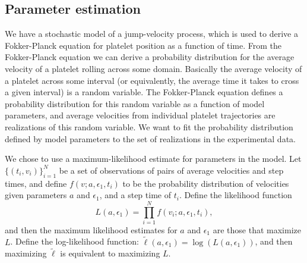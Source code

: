 
\subsection{Parameter estimation}
\label{sec:parameter-estimation}


We have a stochastic model of a jump-velocity process, which is used
to derive a Fokker-Planck equation for platelet position as a function
of time. From the Fokker-Planck equation we can derive a probability
distribution for the average velocity of a platelet rolling across
some domain. Basically the average velocity of a platelet across some
interval (or equivalently, the average time it takes to cross a given
interval) is a random variable. The Fokker-Planck equation defines a
probability distribution for this random variable as a function of
model parameters, and average velocities from individual platelet
trajectories are realizations of this random variable. We want to fit
the probability distribution defined by model parameters to the set of
realizations in the experimental data.

We chose to use a maximum-likelihood estimate for parameters in the
model. Let $\{(t_i, v_i)\}_{i=1}^N$ be a set of observations of pairs
of average velocities and step times, and define
$f(v; a, \epsilon_1, t_i)$ to be the probability distribution of
velocities given parameters $a$ and $\epsilon_1$, and a step time of
$t_i$. Define the likelihood function
\begin{equation}
  \label{eq:likelihood}
  L(a, \epsilon_1) = \prod_{i=1}^N f(v_i; a, \epsilon_1, t_i),
\end{equation}
and then the maximum likelihood estimates for $a$ and $\epsilon_1$ are
those that maximize $L$. Define the log-likelihood function:
$\tilde{\ell}(a, \epsilon_1) = \log(L(a, \epsilon_1))$, and then
maximizing $\tilde{\ell}$ is equivalent to maximizing $L$.

